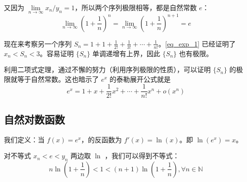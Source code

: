 又因为 $\lim\limits_{n\rightarrow \infty} x_n/y_n = 1$，所以两个序列极限相等，都是自然常数 $e$：
\begin{equation}\label{eq_exp_2}
\lim\limits_{n\rightarrow \infty} \left(1+\frac{1}{n}\right)^n=\lim\limits_{n\rightarrow \infty} \left(1+\frac{1}{n}\right)^{n+1}=e
\end{equation}

现在来考察另一个序列 $S_n=1+1+\frac{1}{2!}+\frac{1}{3!}+\cdots+\frac{1}{n!}$。\autoref{eq_exp_1} 已经证明了 $x_n<S_n<3$。容易证明 $\{S_n\}$ 单调递增有上界，因此 $\{S_n\}$ 也有极限。

利用二项式定理，通过不懈的努力（利用序列极限的性质），可以证明 $\{S_n\}$ 的极限就等于自然常数。这也暗示了 $e^x$ 的泰勒展开公式就是
\begin{equation}
e^x=1+x+\frac{1}{2!}x^2+\cdots+\frac{1}{n!}x^n +o(x^n)
\end{equation}

\subsection{自然对数函数}
我们定义：当 $f(x)=e^x$，的反函数为 $f'(x)=\ln(x)$。即 $\ln(e^x)=x$。

对不等式 $x_n<e<y_n$ 两边取 $\ln$ ，我们可以得到不等式：
\begin{equation}
  n\ln\left(1+\frac{1}{n}\right)<1<(n+1)\ln\left(1+\frac{1}{n}\right), \forall n \in \mathbb{N}
\end{equation}

